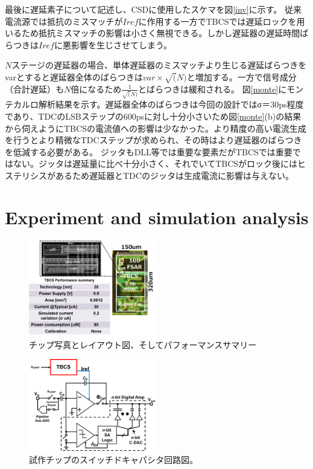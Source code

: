 \documentclass[letterpaper, 10 pt, conference]{ieeeconf}  %
\begin{document}
最後に遅延素子について記述し、CSDに使用したスケマを図\ref{inv}に示す。
従来電流源では抵抗のミスマッチが$I{ref}$に作用する一方でTBCSでは遅延ロックを用いるため抵抗ミスマッチの影響は小さく無視できる。しかし遅延器の遅延時間ばらつきは$I{ref}$に悪影響を生じさせてしまう。

$N$ステージの遅延器の場合、単体遅延器のミスマッチより生じる遅延ばらつきをvarとすると遅延器全体のばらつきは$var \times \sqrt(N)$と増加する。一方で信号成分（合計遅延）も$N$倍になるため$\frac{1}{\sqrt(N)}$とばらつきは緩和される。
図\ref{monte}にモンテカルロ解析結果を示す。遅延器全体のばらつきは今回の設計ではσ＝30ps程度であり、TDCのLSBステップの600psに対し十分小さいため図\ref{monte}(b)の結果から伺えようにTBCSの電流値への影響は少なかった。より精度の高い電流生成を行うとより精微なTDCステップが求められ、その時はより遅延器のばらつきを低減する必要がある。
ジッタもDLL等では重要な要素だがTBCSでは重要ではない。ジッタは遅延量に比べ十分小さく、それでいてTBCSがロック後にはヒステリシスがあるため遅延器とTDCのジッタは生成電流に影響は与えない。

\section{Experiment and simulation analysis}
\begin{figure}[!]
\centering
 \includegraphics[width=0.5\textwidth]{figs/chip.png}
  \caption{チップ写真とレイアウト図、そしてパフォーマンスサマリー}
\label{chip}
\end{figure}

\begin{figure}[!]
\centering
 \includegraphics[width=0.5\textwidth]{figs/switchcap.png}
  \caption{試作チップのスイッチドキャパシタ回路図。}
\label{scap}
\end{figure}
\end{document}
